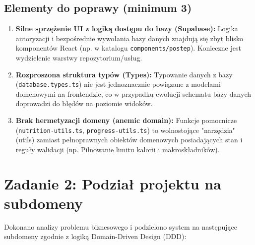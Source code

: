 \documentclass[12pt,a4paper]{article}
\begin{document}
\subsection{Elementy do poprawy (minimum 3)}
\begin{enumerate}
    \item \textbf{Silne sprzężenie UI z logiką dostępu do bazy (Supabase):} Logika autoryzacji i bezpośrednie wywołania bazy danych znajdują się zbyt blisko komponentów React (np. w katalogu \texttt{components/postep}). Konieczne jest wydzielenie warstwy repozytorium/usług.
    \item \textbf{Rozproszona struktura typów (Types):} Typowanie danych z bazy (\texttt{database.types.ts}) nie jest jednoznacznie powiązane z modelami domenowymi na frontendzie, co w przypadku ewolucji schematu bazy danych doprowadzi do błędów na poziomie widoków.
    \item \textbf{Brak hermetyzacji domeny (anemic domain):} Funkcje pomocnicze (\texttt{nutrition-utils.ts}, \texttt{progress-utils.ts}) to wolnostojące "narzędzia" (utils) zamiast pełnoprawnych obiektów domenowych posiadających stan i reguły walidacji (np. Pilnowanie limitu kalorii i makroskładników).
\end{enumerate}

\section{Zadanie 2: Podział projektu na subdomeny}

Dokonano analizy problemu biznesowego i podzielono system na następujące subdomeny zgodnie z logiką Domain-Driven Design (DDD):
\end{document}
